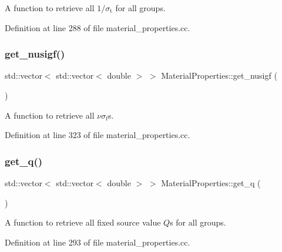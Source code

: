 A function to retrieve all $1/\sigma_\mathrm{t}$ for all groups. 



Definition at line 288 of file material\+\_\+properties.\+cc.

\mbox{\label{class_material_properties_a75afcc7707f4d77aedf439bacacbfb51}} 
\subsubsection{\texorpdfstring{get\+\_\+nusigf()}{get\_nusigf()}}
{\footnotesize\ttfamily std\+::vector$<$ std\+::vector$<$ double $>$ $>$ Material\+Properties\+::get\+\_\+nusigf (\begin{DoxyParamCaption}{ }\end{DoxyParamCaption})}



A function to retrieve all $\nu\sigma_\mathrm{f}$\textquotesingle{}s. 



Definition at line 323 of file material\+\_\+properties.\+cc.

\mbox{\label{class_material_properties_a0bbf8a7d69c73288b015b4247ab0451c}} 
\subsubsection{\texorpdfstring{get\+\_\+q()}{get\_q()}}
{\footnotesize\ttfamily std\+::vector$<$ std\+::vector$<$ double $>$ $>$ Material\+Properties\+::get\+\_\+q (\begin{DoxyParamCaption}{ }\end{DoxyParamCaption})}



A function to retrieve all fixed source value $Q$\textquotesingle{}s for all groups. 



Definition at line 293 of file material\+\_\+properties.\+cc.

\mbox{\label{class_material_properties_a3903e07c80bfe939a3a70be59c74bc53}} 
